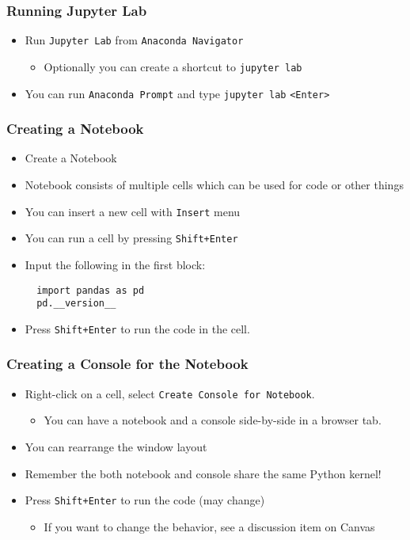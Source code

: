 \documentclass[10pt,article]{article}
\begin{document}
\subsubsection{Running Jupyter Lab}
\label{sec:orgb3640c1}
\begin{itemize}
\item Run \texttt{Jupyter Lab} from \texttt{Anaconda Navigator}
\begin{itemize}
\item Optionally you can create a shortcut to \texttt{jupyter lab}
\end{itemize}
\item You can run \texttt{Anaconda Prompt} and type \texttt{jupyter lab} \texttt{<Enter>}
\end{itemize}
\subsubsection{Creating a Notebook}
\label{sec:org5340012}
\begin{itemize}
\item Create a Notebook
\item Notebook consists of multiple cells which can be used for code or other things
\item You can insert a new cell with \texttt{Insert} menu
\item You can run a cell by pressing \texttt{Shift+Enter}
\end{itemize}

\begin{itemize}
\item Input the following in the first block: 

\begin{verbatim}
  import pandas as pd
  pd.__version__
\end{verbatim}

\item Press \texttt{Shift+Enter} to run the code in the cell.
\end{itemize}
\subsubsection{Creating a Console for the Notebook}
\label{sec:org1d554c8}
\begin{itemize}
\item Right-click on a cell, select \texttt{Create Console for Notebook}.
\begin{itemize}
\item You can have a notebook and a console side-by-side in a browser tab.
\end{itemize}
\item You can rearrange the window layout
\item Remember the both notebook and console share the same Python kernel!
\item Press \texttt{Shift+Enter} to run the code (may change)
\begin{itemize}
\item If you want to change the behavior, see a discussion item on Canvas
\end{itemize}
\end{itemize}
\end{document}
